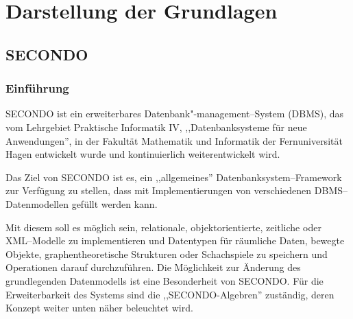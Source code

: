 
\chapter[Darstellung der Grundlagen ]{Darstellung der Grundlagen} \label{Kapitel2}
\minitoc
\newpage
\section{SECONDO}\label{SecondoEinfuehrung}

\subsection{Einführung}
SECONDO ist ein erweiterbares Datenbank"-management--System (DBMS), das vom Lehrgebiet Praktische Informatik IV, ,,Datenbanksysteme für neue Anwendungen'', in der Fakultät Mathematik und Informatik der Fernuniversität Hagen entwickelt wurde und kontinuierlich weiterentwickelt wird.

Das Ziel von SECONDO ist es, ein ,,allgemeines'' Datenbanksystem--Framework zur Verfügung zu stellen, dass mit Implementierungen von verschiedenen DBMS--Datenmodellen gefüllt werden kann.

Mit diesem soll es möglich sein, relationale, objektorientierte, zeitliche oder XML--Modelle zu implementieren und Datentypen für räumliche Daten, bewegte Objekte, graphentheoretische Strukturen oder Schachspiele zu speichern und Operationen darauf durchzuführen. Die Möglichkeit zur Änderung des grundlegenden Datenmodells ist eine Besonderheit von SECONDO. Für die Erweiterbarkeit des Systems sind die ,,SECONDO-Algebren'' zuständig, deren Konzept weiter unten näher beleuchtet wird.

